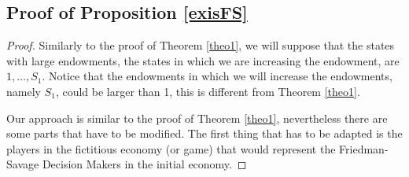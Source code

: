 \documentclass[pdftex]{article}
\numberwithin{equation}{section}
\theoremstyle{th}
\newtheorem{proof lemma}{{Proof Lemma}.}
\theoremstyle{definition}
\newtheorem*{risk lovers}{Risk lovers}
\newtheorem*{risk averse}{Risk averse}
\begin{document}
{%
%
%
%
%
%

\subsection{Proof of Proposition \ref{exisFS}}

\label{appC}
\begin{proof}
{Similarly to the proof of Theorem \ref{theo1}, we will suppose that the states with large endowments, the states in which we are increasing the endowment, are $1,\dots,S_1$. Notice that the endowments in which we will increase the endowments, namely $S_1$, could be larger than 1, this is different from Theorem \ref{theo1}.}

Our approach is similar to the proof of Theorem \ref{theo1}, nevertheless there are some parts that have to be modified. The first thing that has to be adapted is the players in the fictitious economy (or game) that would represent the Friedman-Savage Decision Makers in the initial economy.


\end{proof}}
\end{document}
